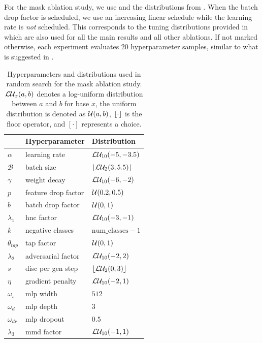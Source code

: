 For the mask ablation study, we use \adam \cite{Kingma2015} and the distributions from . When the batch drop factor is scheduled, we use an increasing linear schedule while the learning rate is \emph{not} scheduled. This corresponds to the tuning distributions provided in \domainbed which are also used for all the main results and all other ablations. If not marked otherwise, each experiment evaluates $20$ hyperparameter samples, similar to what is suggested in \domainbed.

\begin{table}[!htbp]
\small
    \centering
    \begin{tabular}{lll}
        \toprule
        & \textbf{Hyperparameter} & \textbf{Distribution} \\
        \midrule
        $\alpha$ & learning rate & $\mathcal{L}\mathcal{U}_{10}(-5, -3.5)$ \\
        $\mathcal{B}$ & batch size  & $\lfloor\mathcal{L}\mathcal{U}_{2}(3, 5.5)\rfloor$ \\
        $\gamma$ & weight decay  & $\mathcal{L}\mathcal{U}_{10}(-6, -2)$ \\
        $p$ & feature drop factor  & $\mathcal{U}(0.2, 0.5)$ \\
        $b$ & batch drop factor  & $\mathcal{U}(0, 1)$ \\
        $\lambda_1$ & hnc factor & $\mathcal{L}\mathcal{U}_{10}(-3, -1)$ \\
        $k$ & negative classes & $\mathrm{num\_classes} - 1$ \\
        $\theta_{tap}$ & tap factor & $\mathcal{U}(0, 1)$ \\
        $\lambda_2$ & adversarial factor & $\mathcal{L}\mathcal{U}_{10}(-2, 2)$ \\
        $s$ &disc per gen step & $\lfloor\mathcal{L}\mathcal{U}_{2}(0, 3)\rfloor$ \\
        $\eta$ & gradient penalty & $\mathcal{L}\mathcal{U}_{10}(-2, 1)$ \\
        $\omega_s$ & mlp width & $512$ \\
        $\omega_d$ & mlp depth & $3$ \\
        $\omega_{dr}$ & mlp dropout & $0.5$ \\
        $\lambda_3$ & mmd factor & $\mathcal{L}\mathcal{U}_{10}(-1, 1)$ \\
        \bottomrule 
    \end{tabular}
    \caption[Hyperparameters and distributions used for the mask ablation study]{Hyperparameters and distributions used in random search for the mask ablation study. $\mathcal{L}\mathcal{U}_{x}(a, b)$ denotes a log-uniform distribution between $a$ and $b$ for base $x$, the uniform distribution is denoted as $\mathcal{U}(a, b)$, $\lfloor\cdot\rfloor$ is the floor operator, and $[\cdot]$ represents a choice.}
    \label{tab:abl-distributions-mask}
\end{table}

